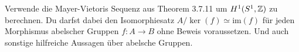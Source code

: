\documentclass{uebung}
\begin{document}
\begin{exercise}
  Verwende die Mayer-Vietoris Sequenz aus Theorem 3.7.11 um $H^1(S^1,\mathbb{Z})$ zu berechnen.
  Du darfst dabei den Isomorphiesatz $A/\ker(f)\simeq \mathrm{im}(f)$ für jeden Morphismus abelscher Gruppen $f:A\to B$ ohne Beweis voraussetzen.
  {\tiny Und auch sonstige hilfreiche Aussagen über abelsche Gruppen.}
\end{exercise}
\end{document}
